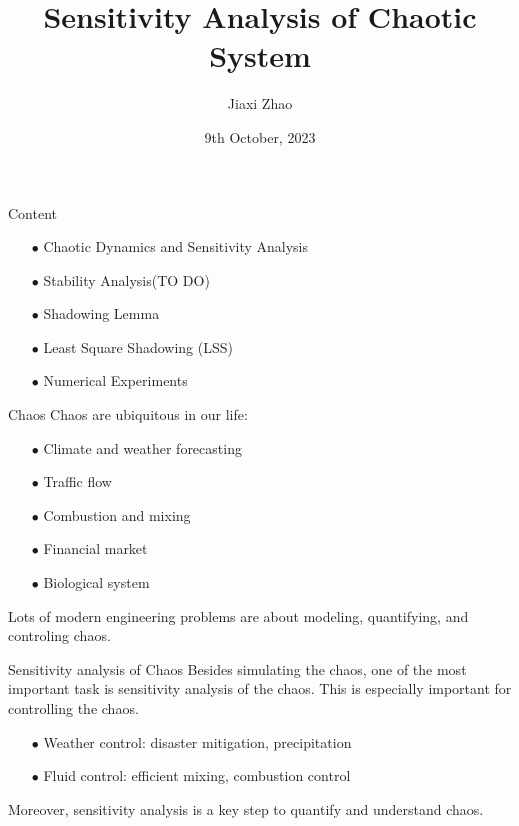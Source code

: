 \documentclass{beamer}
\title[Stability]{Sensitivity Analysis of Chaotic System}
\author[J. Zhao]{Jiaxi Zhao}
\date{9th October, 2023}
\begin{document}
\par \setlength{\parindent}{2em}

\begin{frame}
\titlepage

\end{frame}


\begin{frame}{Content}
	\begin{itemize}
		\item[$\bullet$] Chaotic Dynamics and Sensitivity Analysis
		\item[$\bullet$] {\color{red}Stability Analysis(TO DO)}
		\item[$\bullet$] Shadowing Lemma
		\item[$\bullet$] Least Square Shadowing (LSS)
		\item[$\bullet$] Numerical Experiments
	\end{itemize}
\end{frame}

\begin{frame}{Chaos}
	Chaos are ubiquitous in our life:
	\begin{itemize}
		\item[$\bullet$] Climate and weather forecasting
		\item[$\bullet$] Traffic flow
		\item[$\bullet$] Combustion and mixing
		\item[$\bullet$] Financial market
		\item[$\bullet$] Biological system
	\end{itemize}
	Lots of modern engineering problems are about modeling, quantifying, and controling 
	chaos.
\end{frame}

\begin{frame}{Sensitivity analysis of Chaos}
	Besides simulating the chaos, one of the most important task is sensitivity analysis of the
	chaos. This is especially important for controlling the chaos.
	\begin{itemize}
		\item[$\bullet$] Weather control: disaster mitigation, precipitation
		\item[$\bullet$] Fluid control: efficient mixing, combustion control
	\end{itemize}
	Moreover, sensitivity analysis is a key step to quantify and understand chaos.
\end{frame}
\end{document}
